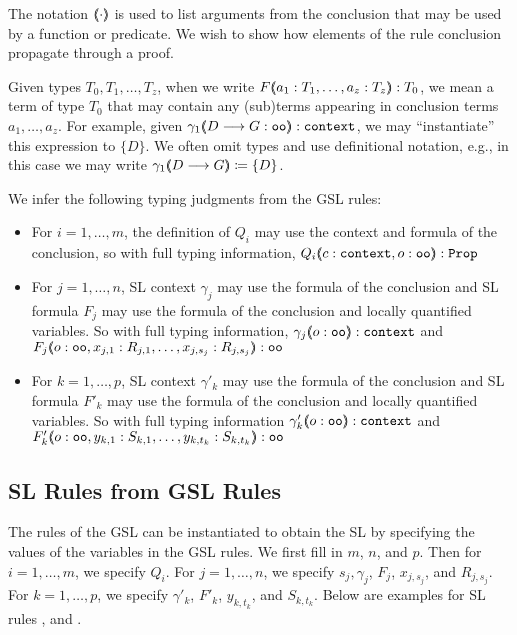 The notation $(\hspace{-0.35em} \langle \cdot \rangle \hspace{-0.35em})$ is used to list arguments from the conclusion that may be used by a function or predicate. We wish to show how elements of the rule conclusion propagate through a proof.

Given types $T_0, T_1 , \ldots , T_z$, when we write $F (\hspace{-0.35em} \langle a_1 : T_1 , \ldots , a_z : T_z \rangle \hspace{-0.35em}) : T_0$, we mean a term of type $T_0$ that may contain any (sub)terms appearing in conclusion terms $a_1, \ldots , a_z$. For example, given $\gamma_1 (\hspace{-0.35em} \langle D \longrightarrow G : \texttt{oo} \rangle \hspace{-0.35em}) : \texttt{context}$, we may ``instantiate'' this expression to $\{ D \}$. We often omit types and use definitional notation, e.g., in this case we may write $\gamma_1 (\hspace{-0.35em} \langle D \longrightarrow G \rangle \hspace{-0.35em}) \coloneqq \{ D \}$.

We infer the following typing judgments from the GSL rules:
\begin{itemize}
 \item For $i = 1 ,\ldots , m$, the definition of $Q_i$ may use the context and formula of the conclusion, so with full typing information, $Q_i (\hspace{-0.35em} \langle c : \texttt{context} , o : \texttt{oo} \rangle \hspace{-0.35em}) : \texttt{Prop}$
 \item For $j = 1 , \ldots , n$, SL context $\gamma_j$ may use the formula of the conclusion and SL formula $F_j$ may use the formula of the conclusion and locally quantified variables. So with full typing information, $\gamma_j (\hspace{-0.35em} \langle o : \texttt{oo} \rangle \hspace{-0.35em}) : \texttt{context}$ and $F_j (\hspace{-0.35em} \langle o : \texttt{oo} , x_{j,1} : R_{j,1} , \ldots , x_{j,s_j} : R_{j,s_j} \rangle \hspace{-0.35em}) : \texttt{oo}$
 \item For $k = 1 , \ldots , p$, SL context $\gamma'_k$ may use the formula of the conclusion and SL formula $F'_k$ may use the formula of the conclusion and locally quantified variables. So with full typing information $\gamma'_k (\hspace{-0.35em} \langle o : \texttt{oo} \rangle \hspace{-0.35em}) : \texttt{context}$ and $F'_k (\hspace{-0.35em} \langle o : \texttt{oo} , y_{k,1} : S_{k,1} , \ldots , y_{k,t_k} : S_{k,t_k} \rangle \hspace{-0.35em}) : \texttt{oo}$
\end{itemize}



\subsection{SL Rules from GSL Rules}
\label{subsec:sltogsl}

The rules of the GSL can be instantiated to obtain the SL by
specifying the values of the variables in the GSL rules. We first fill
in $m$, $n$, and $p$.  Then for $i = 1 , \ldots , m$, we specify
$Q_i$.  For $j = 1 , \ldots , n$, we specify $s_j, \gamma_j$, $F_j$,
$x_{j,s_j}$, and $R_{j,s_j}$. For $k = 1 , \ldots , p$, we specify
$\gamma'_k$, $F'_k$, $y_{k,t_k}$, and $S_{k,t_k}$. Below are examples
for SL rules \rlnmsinit{}, \rlnmsalls{} and \rlnmbimp{}.

